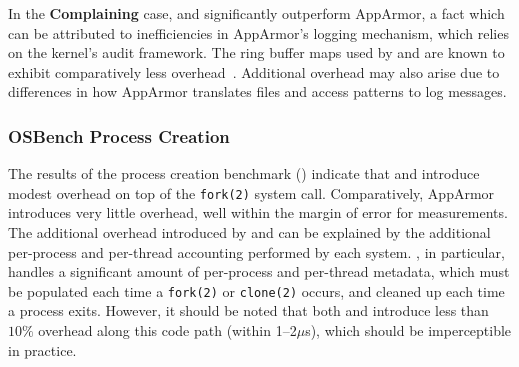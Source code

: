 In the \textbf{Complaining} case, \bpfbox{} and \bpfcontain{} significantly outperform
AppArmor, a fact which can be attributed to inefficiencies in AppArmor's logging
mechanism, which relies on the kernel's audit framework. The ring buffer maps used by
\bpfbox{} and \bpfcontain{} are known to exhibit comparatively less
overhead~\cite{zeng2015_auditing, zhang2021_lsm_file_overhead, nakryiko2020_ringbuf}.
Additional overhead may also arise due to differences in how AppArmor translates files and
access patterns to log messages.

\subsubsection{OSBench Process Creation}

The results of the process creation benchmark () indicate
that \bpfbox{} and \bpfcontain{} introduce modest overhead on top of the \texttt{fork(2)}
system call.  Comparatively, AppArmor introduces very little overhead, well within the
margin of error for measurements. The additional overhead introduced by \bpfbox{} and
\bpfcontain{} can be explained by the additional per-process and per-thread accounting
performed by each system. \bpfcontain{}, in particular, handles a significant amount of
per-process and per-thread metadata, which must be populated each time a \texttt{fork(2)}
or \texttt{clone(2)} occurs, and cleaned up each time a process exits. However, it should
be noted that both \bpfbox{} and \bpfcontain{} introduce less than $10\%$ overhead along
this code path (within 1--2$\mu$s), which should be imperceptible in practice.


